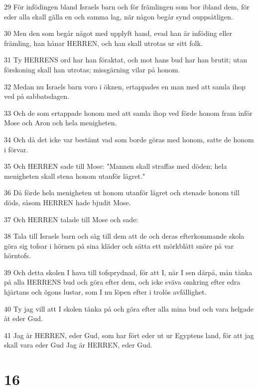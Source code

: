 \par 29 För infödingen bland Israels barn och för främlingen som bor ibland dem, för eder alla skall gälla en och samma lag, när någon begår synd ouppsåtligen.
\par 30 Men den som begår något med upplyft hand, evad han är inföding eller främling, han hånar HERREN, och han skall utrotas ur sitt folk.
\par 31 Ty HERRENS ord har han föraktat, och mot hans bud har han brutit; utan förskoning skall han utrotas; missgärning vilar på honom.
\par 32 Medan nu Israels barn voro i öknen, ertappades en man med att samla ihop ved på sabbatsdagen.
\par 33 Och de som ertappade honom med att samla ihop ved förde honom fram inför Mose och Aron och hela menigheten.
\par 34 Och då det icke var bestämt vad som borde göras med honom, satte de honom i förvar.
\par 35 Och HERREN sade till Mose: "Mannen skall straffas med döden; hela menigheten skall stena honom utanför lägret."
\par 36 Då förde hela menigheten ut honom utanför lägret och stenade honom till döds, såsom HERREN hade bjudit Mose.
\par 37 Och HERREN talade till Mose och sade:
\par 38 Tala till Israels barn och säg till dem att de och deras efterkommande skola göra sig tofsar i hörnen på sina kläder och sätta ett mörkblått snöre på var hörntofs.
\par 39 Och detta skolen I hava till tofsprydnad, för att I, när I sen därpå, mån tänka på alla HERRENS bud och göra efter dem, och icke sväva omkring efter edra hjärtans och ögons lustar, som I nu löpen efter i trolös avfällighet.
\par 40 Ty jag vill att I skolen tänka på och göra efter alla mina bud och vara helgade åt eder Gud.
\par 41 Jag är HERREN, eder Gud, som har fört eder ut ur Egyptens land, för att jag skall vara eder Gud Jag är HERREN, eder Gud.

\chapter{16}

